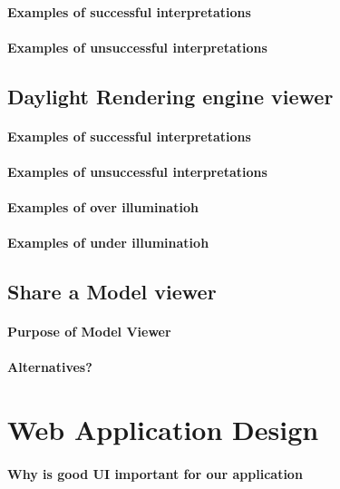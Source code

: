 			\paragraph{Examples of successful interpretations}
			\paragraph{Examples of unsuccessful interpretations}

		\subsection{Daylight Rendering engine viewer}
			\paragraph{Examples of successful interpretations}
			\paragraph{Examples of unsuccessful interpretations}
				\paragraph{Examples of over illuminatioh}
				\paragraph{Examples of under illuminatioh}

		\subsection{Share a Model viewer}
			\paragraph{Purpose of Model Viewer}
			\paragraph{Alternatives?}

	\section{Web Application Design}
		\paragraph{Why is good UI important for our application}
